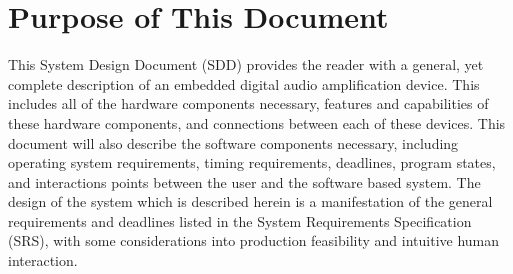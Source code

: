 \cleardoublepage
{}
{}
\chapter*{Purpose of This Document}
This System Design Document (SDD) provides the reader with a general, yet complete description of an embedded digital audio amplification device. This includes all of the hardware components necessary, features and capabilities of these hardware components, and connections between each of these devices. This document will also describe the software components necessary, including operating system requirements, timing requirements, deadlines, program states, and interactions points between the user and the software based system. The design of the system which is described herein is a manifestation of the general requirements and deadlines listed in the System Requirements Specification (SRS), with some considerations into production feasibility and intuitive human interaction.
